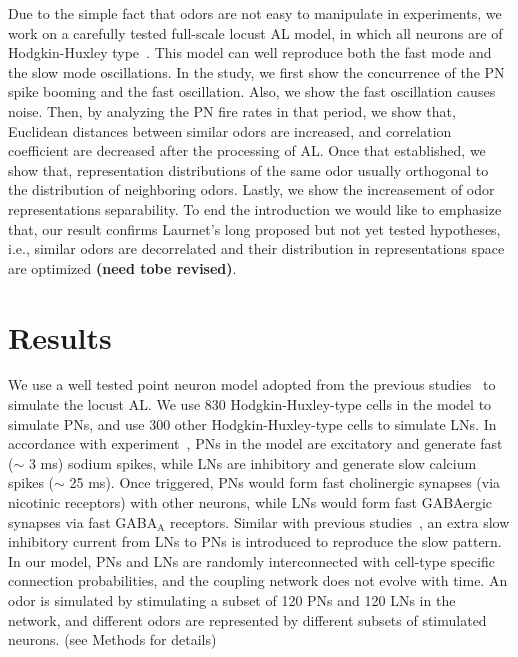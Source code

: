\documentclass[12pt, a4paper]{article}
\begin{document}
Due to the simple fact that odors are not easy to manipulate in experiments, we work on a carefully tested full-scale locust AL model, in which all neurons are of Hodgkin-Huxley type~\citep{Patel2009, Patel2013}. This model can well reproduce both the fast mode and the slow mode oscillations. In the study, we first show the concurrence of the PN spike booming and the fast oscillation. Also, we show the fast oscillation causes noise. Then, by analyzing the PN fire rates in that period, we show that, Euclidean distances between similar odors are increased, and correlation coefficient are decreased after the processing of AL. Once that established, we show that, representation distributions of the same odor usually orthogonal to the distribution of neighboring odors. Lastly, we show the increasement of odor representations separability. To end the introduction we would like to emphasize that, our result confirms Laurnet's long proposed but not yet tested hypotheses, i.e., similar odors are decorrelated and their distribution in representations space are optimized {\bf (need tobe revised)}.


\section{Results}


We use a well tested point neuron model adopted from the previous studies~\citep{} to simulate the locust AL. We use 830 Hodgkin-Huxley-type cells in the model to simulate PNs, and use 300 other Hodgkin-Huxley-type cells to simulate LNs. In accordance with experiment~\citep{}, PNs in the model are excitatory and generate fast ($\sim$ 3 ms) sodium spikes, while LNs are inhibitory and generate slow calcium spikes ($\sim$ 25 ms). Once triggered, PNs would form fast cholinergic synapses (via nicotinic receptors) with other neurons, while LNs would form fast GABAergic synapses via fast GABA$_\mbox{A}$ receptors. Similar with previous studies~\citep{}, an extra slow inhibitory current from LNs to PNs is introduced to reproduce the slow pattern.
In our model, PNs and LNs are randomly interconnected with cell-type specific connection probabilities, %
and the coupling network does not evolve with time.
An odor is simulated by stimulating a subset of 120 PNs and 120 LNs in the network, and different odors are represented by different subsets of stimulated neurons. (see Methods for details)
\end{document}
